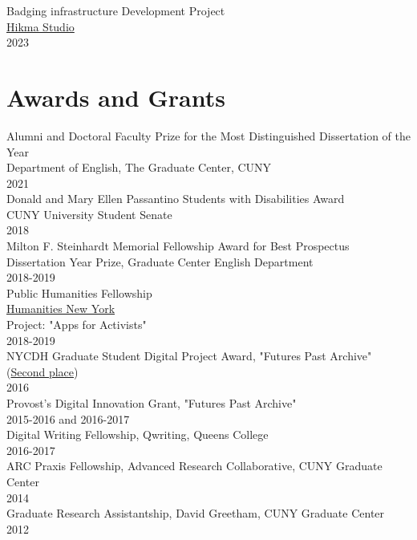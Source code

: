 \documentclass[11pt]{article}
\begin{document}
Badging infrastructure Development Project\\
\href{https://www.hikma.studio/}{Hikma Studio}\\
2023\\

\section*{Awards and Grants}
\label{sec:orgheadline4}
Alumni and Doctoral Faculty Prize for the Most Distinguished Dissertation of the Year\\
Department of English, The Graduate Center, CUNY\\
2021\\

Donald and Mary Ellen Passantino Students with Disabilities Award\\
CUNY University Student Senate\\
2018\\

Milton F. Steinhardt Memorial Fellowship Award for Best Prospectus\\
Dissertation Year Prize, Graduate Center English Department\\
2018-2019\\

Public Humanities Fellowship\\
\href{https://humanitiesny.org/}{Humanities New York}\\
Project: "Apps for Activists"\\
2018-2019\\

NYCDH Graduate Student Digital Project Award, "Futures Past Archive" (\href{http://nycdh.org/nycdh-graduate-student-digital-project-awards-2016/}{Second place})\\
2016\\

Provost's Digital Innovation Grant, "Futures Past Archive"\\
2015-2016 and 2016-2017\\

Digital Writing Fellowship, Qwriting, Queens College\\
2016-2017\\

ARC Praxis Fellowship, Advanced Research Collaborative, CUNY Graduate Center\\
2014\\

Graduate Research Assistantship, David Greetham, CUNY Graduate Center\\
2012\\
\end{document}
